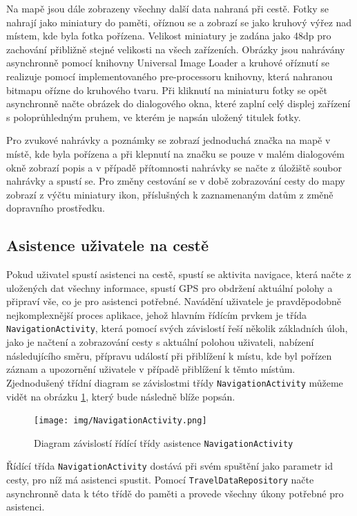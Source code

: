 \documentclass[czech,master,public,dept460,male,java,cpdeclaration]{diploma}
\begin{document}
Na mapě jsou dále zobrazeny všechny další data nahraná při cestě. Fotky se nahrají jako miniatury do paměti,
oříznou se a zobrazí se jako kruhový výřez nad místem, kde byla fotka pořízena.
Velikost miniatury je zadána jako 48dp pro zachování přibližně stejné velikosti na všech zařízeních.
Obrázky jsou nahrávány asynchronně pomocí knihovny Universal Image Loader a kruhové oříznutí se realizuje
pomocí implementovaného pre-processoru knihovny, která nahranou bitmapu ořízne do kruhového tvaru.
Při kliknutí na miniaturu fotky se opět asynchronně načte obrázek do dialogového okna,
které zaplní celý displej zařízení s poloprůhledným pruhem, ve kterém je napsán uložený titulek fotky.

Pro zvukové nahrávky a poznámky se zobrazí jednoduchá značka na mapě v místě, kde byla pořízena a při
klepnutí na značku se pouze v malém dialogovém okně zobrazí popis a v případě přítomnosti nahrávky
se načte z úložiště soubor nahrávky a spustí se. Pro změny cestování se v době zobrazování cesty do mapy
zobrazí z výčtu miniatury ikon, příslušných k zaznamenaným datům z změně dopravního prostředku.

\subsection{Asistence uživatele na cestě}
Pokud uživatel spustí asistenci na cestě, spustí se aktivita navigace, která načte z uložených
dat všechny informace, spustí GPS pro obdržení aktuální polohy a připraví vše, co je pro asistenci potřebné.
Navádění uživatele je pravděpodobně nejkomplexnější proces aplikace, jehož hlavním řídícím prvkem
je třída \texttt{NavigationActivity}, která
pomocí svých závislostí řeší několik základních úloh, jako je načtení a zobrazování cesty s aktuální polohou uživateli,
nabízení následujícího směru, přípravu událostí při přiblížení k místu, kde byl pořízen záznam a upozornění
uživatele v případě přiblížení k těmto místům. Zjednodušený třídní diagram se závislostmi třídy \texttt{NavigationActivity}
můžeme vidět na obrázku \ref{fig:navigationactivitydependencies}, který bude následně blíže popsán.

\begin{figure}[H]
        \centering
                \texttt{[image: img/NavigationActivity.png]}
        \caption{Diagram závislostí řídící třídy asistence \texttt{NavigationActivity}}
        \label{fig:navigationactivitydependencies}
\end{figure}

Řídící třída \texttt{NavigationActivity} dostává při svém spuštění jako parametr id cesty,
pro níž má asistenci spustit. Pomocí \texttt{TravelDataRepository} načte asynchronně data k této třídě
do paměti a provede všechny úkony potřebné pro asistenci.
\end{document}

